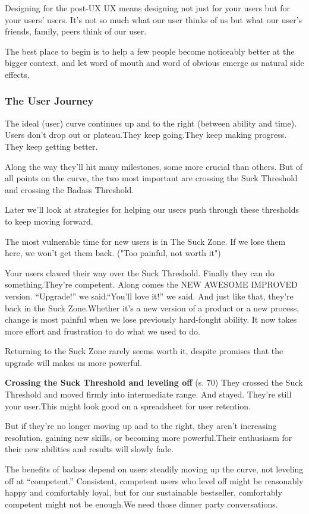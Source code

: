 Designing for the post-UX UX means designing not just for your users but for your users’ users.
It’s not so much what our user thinks of us but what our user’s friends, family, peers think of our user.

The best place to begin is to help a few people become noticeably better at the bigger context, and let word of mouth and word of obvious emerge as natural side effects.

\subsubsection{The User Journey}
The ideal (user) curve continues up and to the right (between ability and time). Users don’t drop out or plateau.They keep going.They keep making progress. They keep getting better.

Along the way they’ll hit many milestones, some more crucial than others. But of all points on the curve, the two most important are crossing the Suck Threshold and crossing the Badass Threshold.

Later we’ll look at strategies for helping our users push through these thresholds to keep moving forward.

The most vulnerable time for new users is in The Suck Zone. If we lose them here, we won’t get them back.  ("Too painful, not worth it")

Your users clawed their way over the Suck Threshold. Finally they can do something.They’re competent.
Along comes the NEW AWESOME IMPROVED version. “Upgrade!” we said.“You’ll love it!” we said.
And just like that, they’re back in the Suck Zone.Whether it’s a new version of a product or a new process, change is most painful when we lose previously hard-fought ability. It now takes more effort and frustration to do what we used to do.

Returning to the Suck Zone rarely seems worth it, despite promises that the upgrade will makes us more powerful.

\textbf{Crossing the Suck Threshold and leveling off} (s. 70)
They crossed the Suck Threshold and moved firmly into intermediate range. And stayed. They’re still your user.This might look good on a spreadsheet for user retention.


But if they’re no longer moving up and to the right, they aren’t increasing resolution, gaining new skills, or becoming more powerful.Their enthusiasm for their new abilities and results will slowly fade.

The benefits of badass depend on users steadily moving
up the curve, not leveling off at “competent.” Consistent, competent users who level off might be reasonably happy and comfortably loyal, but for our sustainable bestseller, comfortably competent might not be enough.We need those dinner party conversations.

